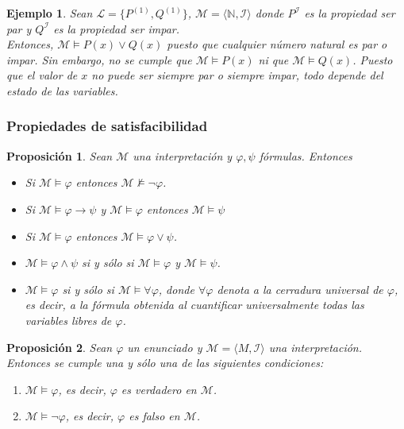 \documentclass[letterpaper,12pt]{article}
\newtheorem{prop}{Proposición}[]
\newtheorem{ejem}{Ejemplo}[]
\begin{document}
    \begin{ejem}
      Sean $\mathcal{L} = \{ P^{(1)}, Q^{(1)}\}$, 
      $\mathcal{M} = \langle \mathbb{N}, \mathcal{I} \rangle$ donde 
      $P^{\mathcal{I}}$ es la propiedad \textit{ser par} y $Q^{\mathcal{I}}$ es 
      la propiedad \textit{ser impar}. \\
      Entonces, $\mathcal{M} \models P(x) \lor Q(x)$ puesto que cualquier 
      número natural es par o impar. Sin embargo, no se cumple que 
      $\mathcal{M} \models P(x)$ ni que $\mathcal{M} \models Q(x)$. Puesto que 
      el valor de $x$ no puede ser siempre par o siempre impar, todo depende 
      del estado de las variables.
    \end{ejem}

    \subsubsection{Propiedades de satisfacibilidad}
    \begin{prop}
      Sean $\mathcal{M}$ una interpretación y $\varphi, \psi$ fórmulas.
      Entonces 
      \begin{itemize}
        \item Si $\mathcal{M} \models \varphi$ entonces 
        $\mathcal{M} \not \models \neg \varphi$.
        \item Si $\mathcal{M} \models \varphi \rightarrow \psi$ y 
        $\mathcal{M} \models \varphi$ entonces $\mathcal{M} \models \psi$
        \item Si $\mathcal{M} \models \varphi$ entonces 
        $\mathcal{M} \models \varphi \lor \psi$.
        \item $\mathcal{M} \models \varphi \land \psi$ si y sólo si 
        $\mathcal{M} \models \varphi$ y $\mathcal{M} \models \psi$.
        \item $\mathcal{M} \models \varphi$ si y sólo si 
        $\mathcal{M} \models \forall \varphi$, donde $\forall \varphi$ denota 
        a la cerradura universal de $\varphi$, es decir, a la fórmula obtenida
        al cuantificar universalmente todas las variables libres de $\varphi$.
      \end{itemize}
    \end{prop}

    \begin{prop}
      Sean $\varphi$ un enunciado y 
      $\mathcal{M} = \langle M, \mathcal{I} \rangle$ una interpretación. 
      Entonces se cumple una y sólo una de las siguientes condiciones:
      \begin{enumerate}
        \item $\mathcal{M} \models \varphi$, es decir, $\varphi$ es verdadero 
        en $\mathcal{M}$.
        \item $\mathcal{M} \models \neg \varphi$, es decir, $\varphi$ es falso 
        en $\mathcal{M}$.
      \end{enumerate} 
    \end{prop}
\end{document}

